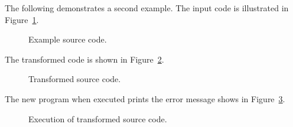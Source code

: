 The following demonstrates a second example. The input code is illustrated in Figure~\ref{Tutorial:exampledefuseCodeb}.

\begin{figure}[!h]
{\indent
{\mySmallFontSize
\begin{latexonly}
   
\end{latexonly}

\begin{htmlonly}
   
\end{htmlonly}

}
}
\caption{Example source code.}
\label{Tutorial:exampledefuseCodeb}
\end{figure}

The transformed code is shown in Figure~\ref{Tutorial:exampledefuseCodeb2}.

\begin{figure}[!h]
{\indent
{\mySmallFontSize
\begin{latexonly}
   
\end{latexonly}

\begin{htmlonly}
   
\end{htmlonly}

}
}
\caption{Transformed source code.}
\label{Tutorial:exampledefuseCodeb2}
\end{figure}

The new program when executed prints the error message shows in Figure~\ref{Tutorial:exampledefuseCodeb3}.

\begin{figure}[!h]
{\indent
{\mySmallFontSize
\begin{latexonly}
   
\end{latexonly}

\begin{htmlonly}
   
\end{htmlonly}

}
}
\caption{Execution of transformed source code.}
\label{Tutorial:exampledefuseCodeb3}
\end{figure}


